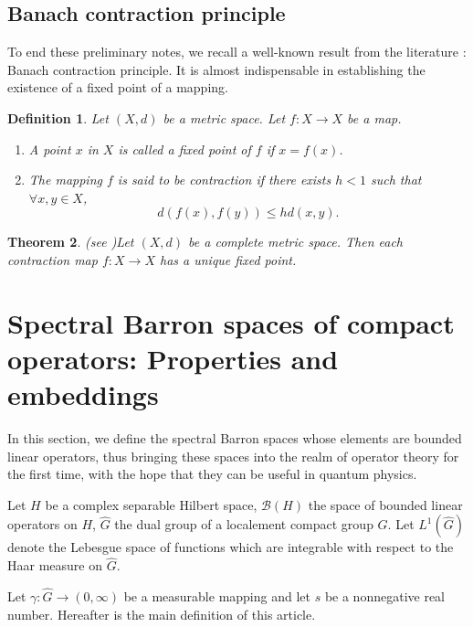 \documentclass[11pt,a4paper]{amsart}
\newtheorem{theorem}{Theorem}[section]
\newtheorem{definition}[theorem]{Definition}
\begin{document}
\subsection{Banach contraction principle}
To end these preliminary notes, we recall a well-known result from the literature : Banach contraction principle. It is  almost indispensable in establishing the existence of a fixed point of a mapping. 

\begin{definition}
Let $(X,d)$ be a metric space. Let $f: X\rightarrow X$ be a map. 
\begin{enumerate}
\item A point $x$ in $X$ is called a fixed point of $f$ if $x=f(x)$.
\item The mapping $f$ is said to be  contraction if there exists $h<1$ such that $\forall x,y\in X$,
$$d(f(x),f(y))\leq hd(x,y).$$ 
\end{enumerate}
\end{definition}
\begin{theorem}(see \cite[Theorem 2.1]{Latif})\label{BCP}
Let $(X,d)$ be a complete metric
space. Then each contraction map $f : X \rightarrow  X$ has a unique fixed point.
\end{theorem}



\section{Spectral Barron spaces of compact operators: Properties and embeddings}\label{Spectral Barron spaces}

In this section, we define the spectral Barron spaces whose elements are bounded linear operators, thus bringing these spaces into the realm of operator theory for the first time, with the hope that they can be useful in quantum physics. 

Let $H$ be a complex separable Hilbert space, $\mathcal{B}(H)$ the space of bounded linear operators on $H$, $\widehat{G}$ the dual group of a localement compact group $G$. 
 Let $L^1(\widehat{G})$ denote the Lebesgue space of  functions which are integrable with respect to the Haar measure on $\widehat{G}$. 

Let $\gamma :\widehat{G}\rightarrow (0,\infty)$ be a measurable mapping and let $s$ be a nonnegative real number.  Hereafter is the main definition of this article.
\end{document}
